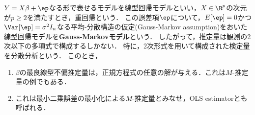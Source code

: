 \documentclass[uplatex,dvipdfmx]{jsreport}
\begin{document}
\begin{tcolorbox}[colframe=ForestGreen, colback=ForestGreen!10!white,breakable,colbacktitle=ForestGreen!40!white,coltitle=black,fonttitle=\bfseries\sffamily,
title=]
    $Y=X\beta+\ep$なる形で表せるモデルを線型回帰モデルといい，$X\in\R^p$の次元が$p\ge2$を満たすとき，重回帰という．
    この誤差項$\ep$について，$E[\ep]=0$かつ$\Var[\ep]=\sigma^2I_n$なる平均-分散構造の仮定(Gauss-Markov assumption)をおいた線型回帰モデルを\textbf{Gauss-Markovモデル}という．
    したがって，推定量は観測の2次以下の多項式で構成するしかない．
    特に，2次形式を用いて構成された検定量を分散分析という．
    このとき，
    \begin{enumerate}
        \item $\beta$の最良線型不偏推定量は，正規方程式の任意の解が与える．これは$M$-推定量の例でもある．
        \item これは最小二乗誤差の最小化による$M$-推定量とみなせ，OLS estimatorとも呼ばれる．
    \end{enumerate}
\end{tcolorbox}
\end{document}

